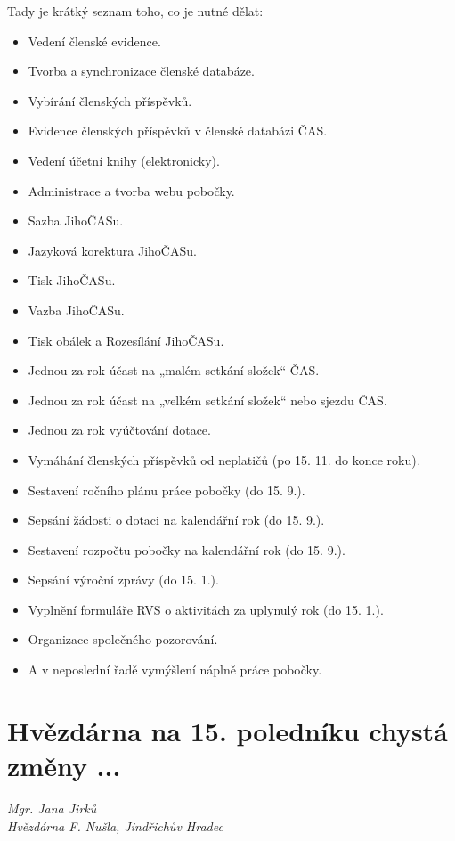 \documentclass[10pt,a5paper,twoside]{book}
\newcommand{\autor}[1]{
	\begin{flushright}
	\textit{#1}
	\end{flushright}
}
\begin{document}
Tady je krátký seznam toho, co je nutné dělat:

\begin{itemize}
  \setlength\itemsep{-1.7mm}
\item Vedení členské evidence.
\item Tvorba a synchronizace členské databáze.
\item Vybírání členských příspěvků.
\item Evidence členských příspěvků v členské databázi ČAS.
\item Vedení účetní knihy (elektronicky).
\item Administrace a tvorba webu pobočky.
\item Sazba JihoČASu.
\item Jazyková korektura JihoČASu.
\item Tisk JihoČASu.
\item Vazba JihoČASu.
\item Tisk obálek a Rozesílání JihoČASu.
\item Jednou za rok účast na „malém setkání složek“ ČAS.
\item Jednou za rok účast na „velkém setkání složek“ nebo sjezdu ČAS.
\item Jednou za rok vyúčtování dotace.
\item Vymáhání členských příspěvků od neplatičů (po 15. 11. do konce roku).
\item Sestavení ročního plánu práce pobočky (do 15. 9.).
\item Sepsání žádosti o dotaci na kalendářní rok (do 15. 9.).
\item Sestavení rozpočtu pobočky na kalendářní rok (do 15. 9.).
\item Sepsání výroční zprávy (do 15. 1.).
\item Vyplnění formuláře RVS o aktivitách za uplynulý rok (do 15. 1.).
\item Organizace společného pozorování.
\item A v neposlední řadě vymýšlení náplně práce pobočky.
\end{itemize}






\newpage
\section*{Hvězdárna na 15. poledníku chystá změny ...}
\autor{Mgr. Jana Jirků \\ Hvězdárna F. Nušla, Jindřichův Hradec}
\end{document}
